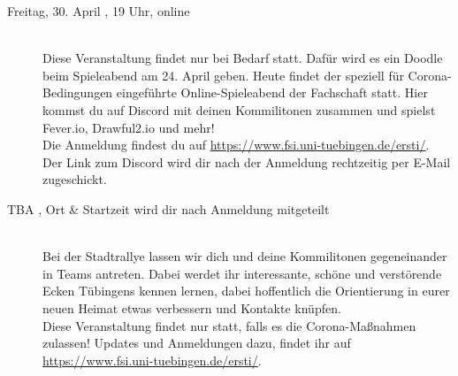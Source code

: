 \begin{description}
\ifml
\else
    \item[Freitag, 30. April \YEAR, 19 Uhr, online]\ \\
        Diese Veranstaltung findet nur bei Bedarf statt. Dafür wird es ein Doodle beim Spieleabend am 24. April geben.
        Heute findet der speziell für Corona-Bedingungen eingeführte Online-Spieleabend der Fachschaft statt. Hier kommst du auf Discord mit deinen Kommilitonen zusammen und spielst Fever.io, Drawful2.io und mehr!\\ 
        Die Anmeldung findest du auf \url{https://www.fsi.uni-tuebingen.de/ersti/}.\\
        Der Link zum Discord wird dir nach der Anmeldung rechtzeitig per E-Mail zugeschickt.
\fi

\ifml

\else
	 \item[TBA \YEAR,  \footnotesize{Ort \& Startzeit wird dir nach Anmeldung mitgeteilt}]\ \\
	 Bei der Stadtrallye lassen wir dich und deine Kommilitonen gegeneinander in Teams antreten. Dabei werdet ihr interessante, schöne und verstörende Ecken Tübingens kennen lernen, dabei hoffentlich die Orientierung in eurer neuen Heimat etwas verbessern und Kontakte knüpfen.\\
	 Diese Veranstaltung findet nur statt, falls es die Corona-Maßnahmen zulassen! Updates und Anmeldungen dazu, findet ihr auf \url{https://www.fsi.uni-tuebingen.de/ersti/}.
\fi


\end{description}
